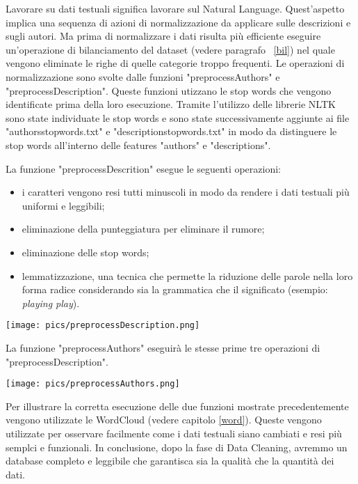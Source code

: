 \documentclass[12pt,oneside]{article}
\begin{document}
\begin{enumerate}
    \begin{justify}
    Lavorare su dati testuali significa lavorare sul Natural Language. Quest'aspetto implica una sequenza di azioni di normalizzazione da applicare sulle descrizioni e sugli autori. Ma prima di normalizzare i dati risulta più efficiente eseguire un'operazione di bilanciamento del dataset (vedere paragrafo ~\ref{bil}) nel quale vengono eliminate le righe di quelle categorie troppo frequenti.
    Le operazioni di normalizzazione sono svolte dalle funzioni "preprocessAuthors" e "preprocessDescription". Queste funzioni utizzano le stop words che vengono identificate prima della loro esecuzione. Tramite l'utilizzo delle librerie NLTK sono state individuate le stop words e sono state successivamente aggiunte ai file "authors\textunderscore{}stopwords.txt" e "description\textunderscore{}stopwords.txt" in modo da distinguere le stop words all'interno delle features "authors" e "descriptions". 
    \end{justify}
    \newpage
    \hfill
    \hfill
    \begin{justify}
    \hypertarget{preD}{
    La funzione "preprocessDescrition" esegue le seguenti operazioni:
    \begin{itemize}
        \item i caratteri vengono resi tutti minuscoli in modo da rendere i dati testuali più uniformi e leggibili;
        \item eliminazione della punteggiatura per eliminare il rumore;
        \item eliminazione delle stop words;
        \item lemmatizzazione, una tecnica che permette la riduzione delle parole nella loro forma radice considerando sia la grammatica che il significato (esempio: \textit{playing play}).
    \end{itemize}
    }
    \end{justify}
    
    \hfill
    \hfill
    
    \texttt{[image: pics/preprocessDescription.png]}
    \newpage
    \begin{justify}
    \hypertarget{preA}{
    La funzione "preprocessAuthors" eseguirà le stesse prime tre operazioni di "preprocessDescription".
    }
    \end{justify}
    
    \texttt{[image: pics/preprocessAuthors.png]}
    \begin{justify}
    Per illustrare la corretta esecuzione delle due funzioni mostrate precedentemente vengono utilizzate le WordCloud (vedere capitolo \ref{word}). Queste vengono utilizzate per osservare facilmente come i dati testuali siano cambiati e resi più semplci e funzionali.
    In conclusione, dopo la fase di Data Cleaning, avremmo un database completo e leggibile che garantisca sia la qualità che la quantità dei dati. 
    \end{justify}
    \end{enumerate}
    
\end{document}

